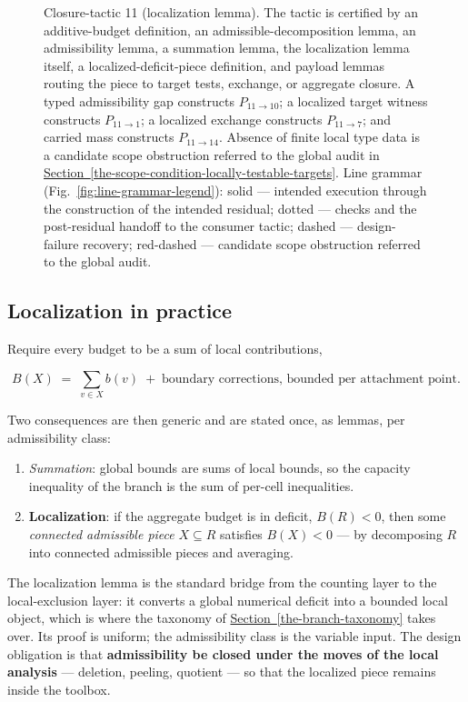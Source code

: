\documentclass[
  11pt,
]{article}
\providecommand{\tightlist}{%
  \setlength{\itemsep}{0pt}\setlength{\parskip}{0pt}}
\theoremstyle{definition}
\newcommand{\secref}[1]{\hyperref[#1]{Section~\ref*{#1}}}
\begin{document}
\begin{figure}[p]
{}
\caption[Closure-tactic 11: localization lemma]{Closure-tactic 11 (localization lemma).  The tactic is certified by an additive-budget definition, an admissible-decomposition lemma, an admissibility lemma, a summation lemma, the localization lemma itself, a localized-deficit-piece definition, and payload lemmas routing the piece to target tests, exchange, or aggregate closure.  A typed admissibility gap constructs \(P_{11\to10}\); a localized target witness constructs \(P_{11\to1}\); a localized exchange constructs \(P_{11\to7}\); and carried mass constructs \(P_{11\to14}\).  Absence of finite local type data is a candidate scope obstruction referred to the global audit in \secref{the-scope-condition-locally-testable-targets}.  Line grammar (Fig.~\ref{fig:line-grammar-legend}): solid --- intended execution through the construction of the intended residual; dotted --- checks and the post-residual handoff to the consumer tactic; dashed --- design-failure recovery; red-dashed --- candidate scope obstruction referred to the global audit.}
\label{fig:ct11-localization}
\end{figure}
\FloatBarrier

\subsection*{Localization in practice}

Require every budget to be a sum of local contributions,

\[
B(X)\;=\;\sum_{v\in X} b(v)\;+\;\text{boundary corrections, bounded per attachment point.}
\]

Two consequences are then generic and are stated once, as lemmas, per
admissibility class:

\begin{enumerate}
\def\labelenumi{\arabic{enumi}.}
\tightlist
\item
  \emph{Summation}: global bounds are sums of local bounds, so the
  capacity inequality of the branch is the sum of per-cell inequalities.
\item
  \textbf{Localization}: if the aggregate budget is in deficit,
  \(B(R)<0\), then some \emph{connected admissible piece}
  \(X\subseteq R\) satisfies \(B(X)<0\) --- by decomposing \(R\) into
  connected admissible pieces and averaging.
\end{enumerate}

The localization lemma is the standard bridge from the counting layer to
the local-exclusion layer: it converts a global numerical deficit into a
bounded local object, which is where the taxonomy of \secref{the-branch-taxonomy} takes
over. Its proof is uniform; the admissibility class is the variable
input. The design obligation is that \textbf{admissibility be closed
under the moves of the local analysis} --- deletion, peeling, quotient
--- so that the localized piece remains inside the toolbox.
\end{document}
